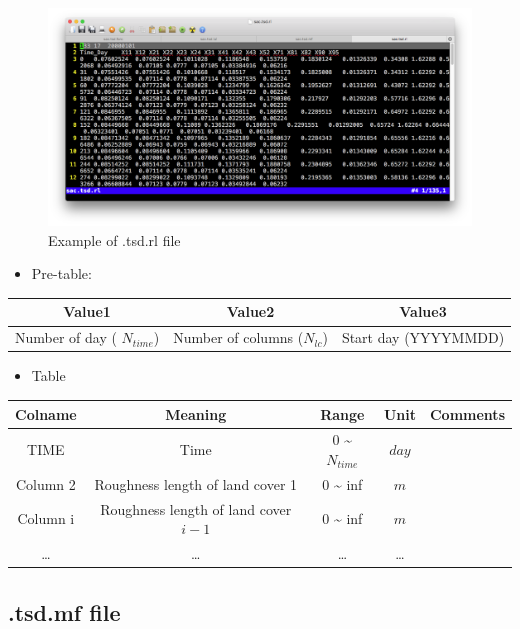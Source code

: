 \documentclass[]{scrbook}
\providecommand{\tightlist}{%
  \setlength{\itemsep}{0pt}\setlength{\parskip}{0pt}}
\begin{document}
\begin{figure}
\centering
\includegraphics{Fig/IO/tsd.rl.png}
\caption{Example of .tsd.rl file}
\end{figure}

\begin{itemize}
\tightlist
\item
  Pre-table:
\end{itemize}

\begin{longtable}[]{@{}ccc@{}}
\toprule
Value1 & Value2 & Value3\tabularnewline
\midrule
\endhead
Number of day ( \(N_{time}\)) & Number of columns (\(N_{lc}\)) & Start
day (YYYYMMDD)\tabularnewline
\bottomrule
\end{longtable}

\begin{itemize}
\tightlist
\item
  Table
\end{itemize}

\begin{longtable}[]{@{}ccccc@{}}
\toprule
Colname & Meaning & Range & Unit & Comments\tabularnewline
\midrule
\endhead
TIME & Time & 0 \textasciitilde{} \(N_{time}\) & \(day\)
&\tabularnewline
Column 2 & Roughness length of land cover 1 & 0 \textasciitilde{} inf &
\(m\) &\tabularnewline
Column i & Roughness length of land cover \(i-1\) & 0 \textasciitilde{}
inf & \(m\) &\tabularnewline
\ldots{} & \ldots{} & \ldots{} & \ldots{} &\tabularnewline
\bottomrule
\end{longtable}

\subsection{.tsd.mf file}\label{tsd.mf-file}
\end{document}
